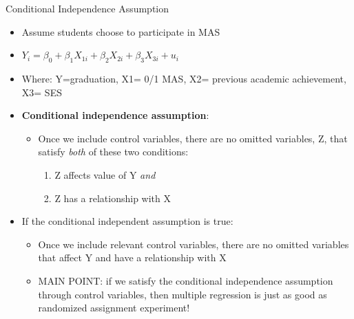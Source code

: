 \documentclass[8pt,ignorenonframetext,dvipsnames]{beamer}
\providecommand{\tightlist}{%
  \setlength{\itemsep}{0pt}\setlength{\parskip}{0pt}}
\renewcommand{\textbf}[1]{{\color{darkgray}\bfseries\fontfamily{Montserrat-TOsF}#1}}
\let\olditem\item
\renewcommand{\item}{%
  \olditem\vspace{4pt}
}
\begin{document}
\begin{frame}{Conditional Independence Assumption}
\protect\hypertarget{conditional-independence-assumption}{}

\begin{itemize}
\tightlist
\item
  Assume students choose to participate in MAS
\item
  \(Y_i = \beta_0 + \beta_1X_{1i} + \beta_2X_{2i} + \beta_3X_{3i} + u_i\)
\item
  Where: Y=graduation, X1= 0/1 MAS, X2= previous academic achievement,
  X3= SES
\item
  \textbf{Conditional independence assumption}:

  \begin{itemize}
  \tightlist
  \item
    Once we include control variables, there are no omitted variables,
    Z, that satisfy \emph{both} of these two conditions:

    \begin{enumerate}
    [(1)]
    \tightlist
    \item
      Z affects value of Y \emph{and}
    \item
      Z has a relationship with X
    \end{enumerate}
  \end{itemize}
\item
  If the conditional independent assumption is true:

  \begin{itemize}
  \tightlist
  \item
    Once we include relevant control variables, there are no omitted
    variables that affect Y and have a relationship with X
  \item
    MAIN POINT: if we satisfy the conditional independence assumption
    through control variables, then multiple regression is just as good
    as randomized assignment experiment!
  \end{itemize}
\end{itemize}

\end{frame}
\end{document}
